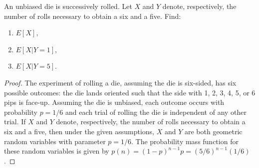 \begin{problem}{3.8}
  An unbiased die is successively rolled. Let $X$ and $Y$ denote, respectively, the number
  of rolls necessary to obtain a six and a five. Find:
  \begin{enumerate}
    \item $E[X]$,
    \item $E[X|Y=1]$,
    \item $E[X|Y=5]$.
  \end{enumerate}
\end{problem}

\begin{proof}
  The experiment of rolling a die, assuming the die is six-sided, has
  six possible outcomes: the die lands oriented such that the side with 1, 2, 3, 4, 5, or 6
  pips is face-up. Assuming the die is unbiased, each outcome occurs with probability
  $p=1/6$ and each trial of rolling the die is independent of any other trial.
  If $X$ and $Y$ denote, respectively, the number
  of rolls necessary to obtain a six and a five, then under the given assumptions,
  $X$ and $Y$ are both geometric random variables with parameter $p=1/6$.
  The probability mass function for these random variables is given by $p(n) = (1-p)^{n-1}p = (5/6)^{n-1}(1/6)$.


\end{proof}
